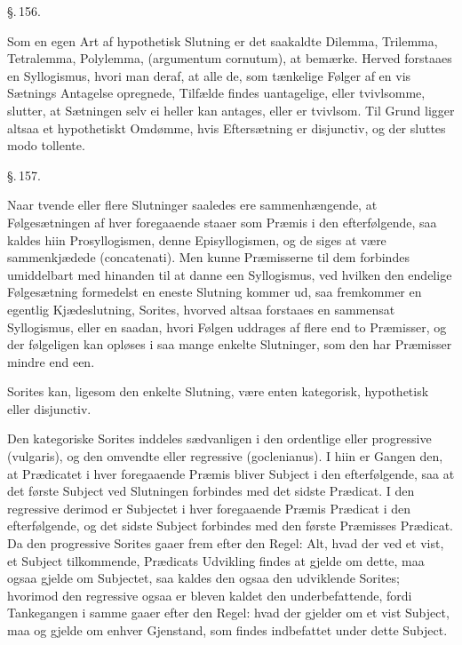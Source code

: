 \documentclass[12pt]{book}
\def\textit#1{#1}%
\def\emph#1{#1}%
\newcommand{\parag}[1]{%
  \par\vspace{0.9\baselineskip}%
  {\centering\textit{\S.\,#1.}\par}%
  \vspace{0.35\baselineskip}%
  \noindent\hspace{\parindent}\ignorespaces
}
\newcommand{\opage}[1]{\marginnote{\footnotesize\textit{[#1]}}}
\begin{document}
\parag{156}

Som en egen Art af hypothetisk Slutning er det saakaldte \emph{Dilemma},
\emph{Trilemma}, \emph{Tetralemma}, \emph{Polylemma}, (\textit{argumentum
cornutum}), at bemærke. Herved forstaaes en Syllogismus, hvori man deraf, at
alle de, som tænkelige Følger af en vis Sætnings Antagelse opregnede, Tilfælde
findes uantagelige, eller tvivlsomme, slutter, at Sætningen selv ei heller kan
antages, eller er tvivlsom. Til Grund ligger altsaa et hypothetiskt Omdømme,
hvis Eftersætning er disjunctiv, og der sluttes \textit{modo tollente}.

\opage{348} \parag{157}

Naar tvende eller flere Slutninger saaledes ere sammenhængende, at
Følgesætningen af hver foregaaende staaer som Præmis i den efterfølgende, saa
kaldes hiin \emph{Prosyllogismen}, denne \emph{Episyllogismen}, og de siges at
være \emph{sammenkjædede} (\textit{concatenati}). Men kunne Præmisserne til dem
forbindes umiddelbart med hinanden til at danne een Syllogismus, ved hvilken
den endelige Følgesætning formedelst en eneste Slutning kommer ud, saa
fremkommer en egentlig \emph{Kjædeslutning}, \emph{Sorites}, hvorved altsaa
forstaaes en sammensat Syllogismus, eller en saadan, hvori Følgen uddrages af
flere end to Præmisser, og der følgeligen kan opløses i saa mange enkelte
Slutninger, som den har Præmisser mindre end een.

Sorites kan, ligesom den enkelte Slutning, være enten \emph{kategorisk},
\emph{hypothetisk} eller \emph{disjunctiv}.

Den kategoriske Sorites inddeles sædvanligen i den ordentlige eller
\emph{progressive} (\textit{vulgaris}), og den omvendte eller
\emph{regressive} (\textit{goclenianus}). I hiin er Gangen den, at Prædicatet i
hver foregaaende Præmis bliver Subject i den efterfølgende, saa at det første
Subject ved Slutningen forbindes med det sidste Prædicat. I den regressive
derimod er Subjectet i hver foregaaende Præmis Prædicat i den efterfølgende, og
det sidste Subject forbindes med den første Præmisses Prædicat. Da den
progressive
\opage{349} Sorites gaaer frem efter den Regel: Alt, hvad der ved et vist, et Subject
tilkommende, Prædicats Udvikling findes at gjelde om dette, maa ogsaa gjelde om
Subjectet, saa kaldes den ogsaa den \emph{udviklende Sorites}; hvorimod den
regressive ogsaa er bleven kaldet den \emph{underbefattende}, fordi
Tankegangen i samme gaaer efter den Regel: hvad der gjelder om et vist Subject,
maa og gjelde om enhver Gjenstand, som findes indbefattet under dette Subject.
\end{document}
